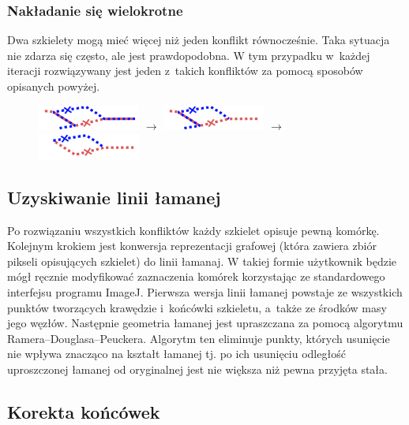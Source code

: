 \documentclass[declaration,shortabstract,mgr]{iithesis}
\begin{document}
\subsubsection{Nakładanie się wielokrotne}

Dwa szkielety mogą mieć więcej niż jeden konflikt równocześnie.
Taka sytuacja nie zdarza się często, ale jest prawdopodobna.
W tym przypadku w~każdej iteracji rozwiązywany jest jeden z~takich konfliktów za pomocą sposobów opisanych powyżej.

\begin{figure}[H]
  \centering
  \includegraphics[valign=m,width=0.3\textwidth]{images/overlap-multi.png}
  $\rightarrow$
  \includegraphics[valign=m,width=0.3\textwidth]{images/overlap-multi-solved1.png}
  $\rightarrow$
  \includegraphics[valign=m,width=0.3\textwidth]{images/overlap-multi-solved2.png}
\end{figure}

\subsection{Uzyskiwanie linii łamanej}

Po rozwiązaniu wszystkich konfliktów każdy szkielet opisuje pewną komórkę.
Kolejnym krokiem jest konwersja reprezentacji grafowej (która zawiera zbiór pikseli opisujących szkielet) do linii łamanaj.
W takiej formie użytkownik będzie mógł ręcznie modyfikować zaznaczenia komórek korzystając ze standardowego interfejsu programu ImageJ.
Pierwsza wersja linii łamanej powstaje ze wszystkich punktów tworzących krawędzie i~końcówki szkieletu, a~także ze środków masy jego węzłów.
Następnie geometria łamanej jest upraszczana za pomocą algorytmu Ramera--Douglasa--Peuckera\cite{algo:ramer}\cite{algo:douglas-peucker}.
Algorytm ten eliminuje punkty, których usunięcie nie wpływa znacząco na kształt łamanej tj. po ich usunięciu odległość uproszczonej łamanej od oryginalnej jest nie większa niż pewna przyjęta stała.

\subsection{Korekta końcówek}
\label{sec:correct-endpoints}
\end{document}
